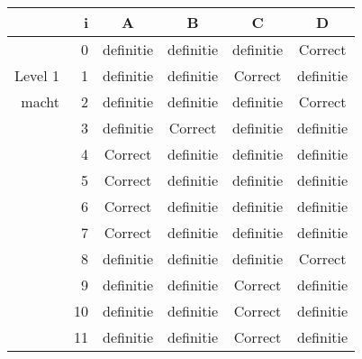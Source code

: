\begin{tabular}{ rr| c|c|c|c}\hline\hline
     & i & \textbf{A} & \textbf{B} & \textbf{C} & \textbf{D}\\\hline

&0&definitie&definitie&definitie&Correct\cellcolor[gray]{0.6}\\
Level 1 & 1&definitie&definitie&Correct\cellcolor[gray]{0.6}&definitie\\
macht &2&definitie&definitie&definitie&Correct\cellcolor[gray]{0.6}\\
&3&definitie&Correct\cellcolor[gray]{0.6}&definitie&definitie\\
&4&Correct\cellcolor[gray]{0.6}&definitie&definitie&definitie\\
&5&Correct\cellcolor[gray]{0.6}&definitie&definitie&definitie\\
&6&Correct\cellcolor[gray]{0.6}&definitie&definitie&definitie\\
&7&Correct\cellcolor[gray]{0.6}&definitie&definitie&definitie\\
&8&definitie&definitie&definitie&Correct\cellcolor[gray]{0.6}\\
&9&definitie&definitie&Correct\cellcolor[gray]{0.6}&definitie\\
&10&definitie&definitie&Correct\cellcolor[gray]{0.6}&definitie\\
&11&definitie&definitie&Correct\cellcolor[gray]{0.6}&definitie\\
\hline\end{tabular}\par\ \newline

